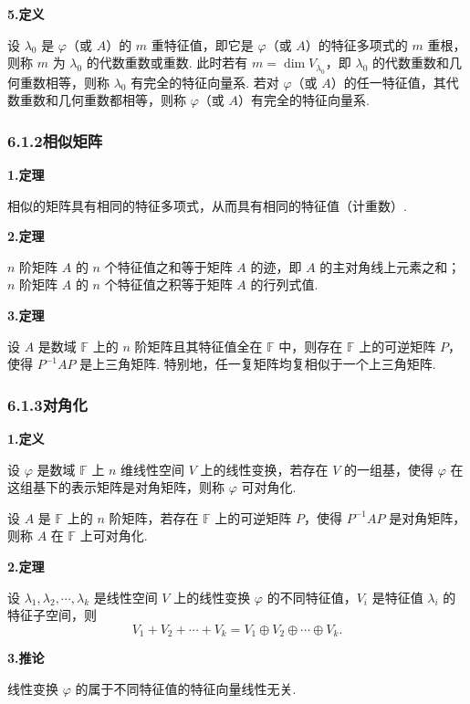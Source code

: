 \documentclass[UTF8,12pt,a4paper,fontset=fandol]{ctexart}
\begin{document}
\noindent\textbf{5.\quad 定义}

设 $\lambda_0$ 是 $\varphi$（或 $A$）的 $m$ 重特征值，即它是 $\varphi$（或 $A$）的特征多项式的 $m$ 重根，则称 $m$ 为 $\lambda_0$ 的代数重数或重数. 此时若有 $m=\dim V_{\lambda_0}$，即 $\lambda_0$ 的代数重数和几何重数相等，则称 $\lambda_0$ 有完全的特征向量系. 若对 $\varphi$（或 $A$）的任一特征值，其代数重数和几何重数都相等，则称 $\varphi$（或 $A$）有完全的特征向量系.

\subsubsection*{6.1.2\quad 相似矩阵}

\noindent\textbf{1.\quad 定理}

相似的矩阵具有相同的特征多项式，从而具有相同的特征值（计重数）.

\noindent\textbf{2.\quad 定理}

$n$ 阶矩阵 $A$ 的 $n$ 个特征值之和等于矩阵 $A$ 的迹，即 $A$ 的主对角线上元素之和；$n$ 阶矩阵 $A$ 的 $n$ 个特征值之积等于矩阵 $A$ 的行列式值.

\noindent\textbf{3.\quad 定理}

设 $A$ 是数域 $\mathbb{F}$ 上的 $n$ 阶矩阵且其特征值全在 $\mathbb{F}$ 中，则存在 $\mathbb{F}$ 上的可逆矩阵 $P$，使得 $P^{-1}AP$ 是上三角矩阵. 特别地，任一复矩阵均复相似于一个上三角矩阵.

\subsubsection*{6.1.3\quad 对角化}

\noindent\textbf{1.\quad 定义}

设 $\varphi$ 是数域 $\mathbb{F}$ 上 $n$ 维线性空间 $V$ 上的线性变换，若存在 $V$ 的一组基，使得 $\varphi$ 在这组基下的表示矩阵是对角矩阵，则称 $\varphi$ 可对角化.

设 $A$ 是 $\mathbb{F}$ 上的 $n$ 阶矩阵，若存在 $\mathbb{F}$ 上的可逆矩阵 $P$，使得 $P^{-1}AP$ 是对角矩阵，则称 $A$ 在 $\mathbb{F}$ 上可对角化.

\noindent\textbf{2.\quad 定理}

设 $\lambda_1,\lambda_2,\cdots,\lambda_k$ 是线性空间 $V$ 上的线性变换 $\varphi$ 的不同特征值，$V_i$ 是特征值 $\lambda_i$ 的特征子空间，则
\[
V_1+V_2+\cdots+V_k=V_1\oplus V_2\oplus\cdots\oplus V_k.
\]

\noindent\textbf{3.\quad 推论}

线性变换 $\varphi$ 的属于不同特征值的特征向量线性无关.
\end{document}
